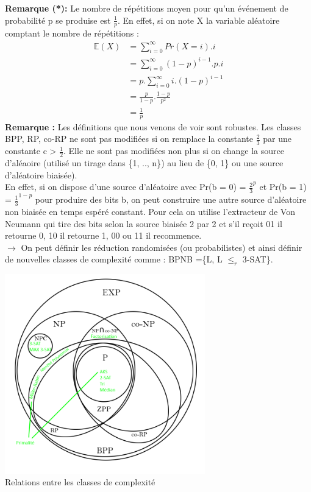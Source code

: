 \documentclass[12pt,a4paper]{article}
\begin{document}
\textbf{Remarque (*):} Le nombre de répétitions moyen pour qu'un événement de probabilité p se produise est $\frac{1}{p}$. En effet, si on note X la variable aléatoire comptant le nombre de répétitions :
\begin{equation}
\begin{split}\nonumber
\mathbb{E}(X) &= \sum\limits_{i = 0}^{\infty}Pr(X = i).i\\
&= \sum\limits_{i = 0}^{\infty}	(1-p)^{i - 1}.p.i\\
&= p.\sum\limits_{i = 0}^{\infty}i.(1-p)^{i - 1}\\
&= \frac{p}{1 - p}.\frac{1 - p}{p^2}\\
&= \frac{1}{p}
\end{split}
\end{equation}
\textbf{Remarque :} Les définitions que nous venons de voir sont robustes. Les classes BPP, RP, co-RP ne sont pas modifiées si on remplace la constante $\frac{2}{3}$ par une constante c > $\frac{1}{2}$. Elle ne sont pas modifiées non plus si on change la source d'aléaoire (utilisé un tirage dans \{1, .., n\}) au lieu de \{0, 1\} ou une source d'aléatoire biaisée).\\
En effet, si on dispose d'une source d'aléatoire avec Pr(b = 0) = $\frac{2}{3}^p$ et Pr(b = 1) = $\frac{1}{3}^{1 - p}$ pour produire des bits b, on peut construire une autre source d'aléatoire non biaisée en temps espéré constant. Pour cela on utilise l'extracteur de Von Neumann qui tire des bits selon la source biaisée 2 par 2 et s'il reçoit 01 il retourne 0, 10 il retourne 1, 00 ou 11 il recommence.\\
$\longrightarrow$ On peut définir les réduction randomisées (ou probabilistes) et ainsi définir de nouvelles classes de complexité comme : BPNB =\{L, L $\leq_r$ 3-SAT\}.
\begin{center}
	\includegraphics[width=0.65\textwidth]{classes.png}\\
	Relations entre les classes de complexité
\end{center}
\end{document}
